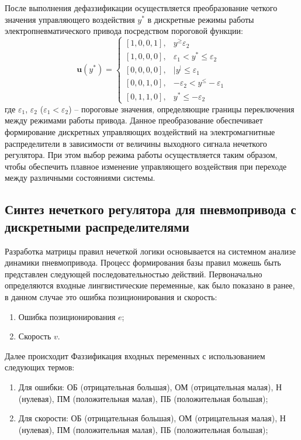 После выполнения дефаззификации осуществляется преобразование четкого значения управляющего воздействия
$y^*$ в дискретные режимы работы электропневматического привода посредством пороговой функции:
\begin{equation}
	\mathbf{u}(y^*) = \begin{cases}
		[1,0,0,1], & y^ \geq \varepsilon_2                   \\
		[1,0,0,0], & \varepsilon_1 < y^* \leq \varepsilon_2  \\
		[0,0,0,0], & |y^| \leq \varepsilon_1                 \\
		[0,0,1,0], & -\varepsilon_2 < y^ \leq -\varepsilon_1 \\
		[0,1,1,0], & y^* \leq -\varepsilon_2
	\end{cases}
\end{equation}
где $\varepsilon_1$, $\varepsilon_2$ ($\varepsilon_1 < \varepsilon_2$) -- пороговые значения, определяющие
границы переключения между режимами работы привода.
Данное преобразование обеспечивает формирование дискретных
управляющих воздействий на электромагнитные распределители в зависимости от
величины выходного сигнала нечеткого регулятора. При этом выбор
режима работы осуществляется таким образом, чтобы обеспечить плавное
изменение управляющего воздействия при переходе между различными состояниями системы.


\subsection*{Синтез нечеткого регулятора для пневмопривода с дискретными распределителями}\label{subsec:ch3/sec4/sub2}

Разработка матрицы правил нечеткой логики основывается на системном
анализе динамики пневмопривода. Процесс формирования базы правил можешь быть представлен
следующей последовательностью действий.
Первоначально определяются входные лингвистические переменные, как было показано в ранее, в данном случае это ошибка позиционирования и скорость:
\begin{enumerate}
	\item Ошибка позиционирования $e$;
	\item Скорость $v$.
\end{enumerate}

Далее происходит Фаззификация входных переменных с использованием следующих термов:
\begin{enumerate}
	\item Для ошибки: {ОБ (отрицательная большая),
	      ОМ (отрицательная малая),
	      Н (нулевая),
	      ПМ (положительная малая),
	      ПБ (положительная большая)};

	\item Для скорости: {ОБ (отрицательная большая),
	      ОМ (отрицательная малая),
	      Н (нулевая),
	      ПМ (положительная малая),
	      ПБ (положительная большая)};
\end{enumerate}


